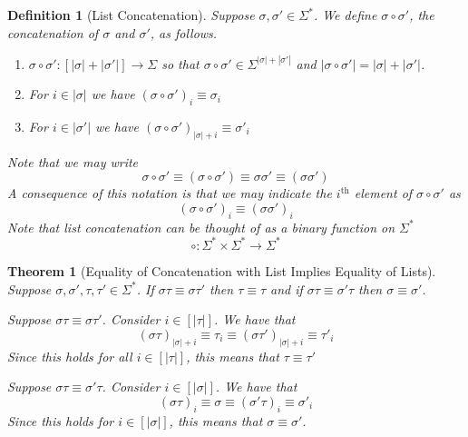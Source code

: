 \documentclass[12pt]{article}
\theoremstyle{break}
\newtheorem{definition}{Definition}[section]
\theoremstyle{break}
\newtheorem{theorem}{Theorem}[section]
\theoremstyle{break}
\theoremstyle{break}
\theoremstyle{break}
\newtheorem{informal definition}[definition]{Informal Definition}
\theoremstyle{break}
\newtheorem{informal theorem}[theorem]{Informal Theorem}
\begin{document}
	\begin{definition}[List Concatenation]
		Suppose $\sigma, \sigma' \in \Sigma^*$.
		We define $\sigma \circ \sigma'$, the concatenation of $\sigma$ and $\sigma'$, as follows.
		\begin{enumerate}
			\item{$\sigma \circ \sigma':[|\sigma| + |\sigma'|] \to \Sigma$ so that $\sigma \circ \sigma' \in \Sigma^{|\sigma| + |\sigma'|}$ and $|\sigma \circ \sigma'| = |\sigma| + |\sigma'|$.}
			\item{For $i \in |\sigma|$ we have $(\sigma\circ \sigma')_i \equiv \sigma_i$}
			\item{For $i \in |\sigma'|$ we have $(\sigma\circ \sigma')_{|\sigma| + i} \equiv \sigma'_i$}
		\end{enumerate}
		
		Note that we may write
		$$
		\sigma \circ \sigma' \equiv (\sigma \circ \sigma') \equiv \sigma \sigma' \equiv (\sigma \sigma')
		$$
		A consequence of this notation is that we may indicate the $i^{\text{th}}$ element of $\sigma \circ \sigma'$ as
		$$
		(\sigma \circ \sigma')_i \equiv (\sigma \sigma')_i
		$$
		Note that list concatenation can be thought of as a binary function on $\Sigma^*$
		$$
		\circ: \Sigma^* \times \Sigma^* \to \Sigma^*
		$$
	\end{definition}
	
	\begin{theorem}[Equality of Concatenation with List Implies Equality of Lists]
		Suppose $\sigma, \sigma', \tau, \tau' \in \Sigma^*$.
		If $\sigma\tau \equiv \sigma\tau'$ then $\tau \equiv \tau$ and if $\sigma \tau \equiv \sigma'\tau$ then $\sigma \equiv \sigma'$.
		
		Suppose $\sigma\tau \equiv \sigma\tau'$.
		Consider $i \in [|\tau|]$.
		We have that
		$$
		(\sigma\tau)_{|\sigma| + i} \equiv \tau_i \equiv (\sigma\tau')_{|\sigma|+i} \equiv \tau'_i
		$$
		Since this holds for all $i \in [|\tau|]$, this means that $\tau \equiv \tau'$
		
		Suppose $\sigma\tau \equiv \sigma' \tau$.
		Consider $i \in [|\sigma|]$.
		We have that
		$$
		(\sigma\tau)_i \equiv \sigma \equiv (\sigma'\tau)_i \equiv \sigma'_i
		$$
		Since this holds for $i \in [|\sigma|]$, this means that $\sigma \equiv \sigma'$.
	\end{theorem}
	
\end{document}

